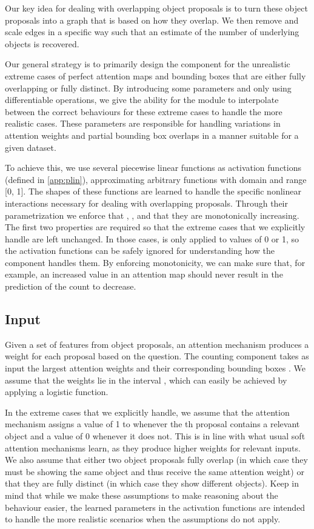 \documentclass[letterpaper]{article}
\begin{document}
Our key idea for dealing with overlapping object proposals is to turn these object proposals into a graph that is based on how they overlap.
We then remove and scale edges in a specific way such that an estimate of the number of underlying objects is recovered.

Our general strategy is to primarily design the component for the unrealistic extreme cases of perfect attention maps and bounding boxes that are either fully overlapping or fully distinct.
By introducing some parameters and only using differentiable operations, we give the ability for the module to interpolate between the correct behaviours for these extreme cases to handle the more realistic cases.
These parameters are responsible for handling variations in attention weights and partial bounding box overlaps in a manner suitable for a given dataset.

To achieve this, we use several piecewise linear functions  as activation functions (defined in \autoref{app:plin}), approximating arbitrary functions with domain and range [0, 1].
The shapes of these functions are learned to handle the specific nonlinear interactions necessary for dealing with overlapping proposals.
Through their parametrization we enforce that , , and that they are monotonically increasing.
The first two properties are required so that the extreme cases that we explicitly handle are left unchanged.
In those cases,  is only applied to values of 0 or 1, so the activation functions can be safely ignored for understanding how the component handles them.
By enforcing monotonicity, we can make sure that, for example, an increased value in an attention map should never result in the prediction of the count to decrease.

\subsection{Input}
Given a set of features from object proposals, an attention mechanism produces a weight for each proposal based on the question.
The counting component takes as input the  largest attention weights  and their corresponding bounding boxes .
We assume that the weights lie in the interval , which can easily be achieved by applying a logistic function.

In the extreme cases that we explicitly handle, we assume that the attention mechanism assigns a value of 1 to  whenever the th proposal contains a relevant object and a value of 0 whenever it does not.
This is in line with what usual soft attention mechanisms learn, as they produce higher weights for relevant inputs.
We also assume that either two object proposals fully overlap (in which case they must be showing the same object and thus receive the same attention weight) or that they are fully distinct (in which case they show different objects).
Keep in mind that while we make these assumptions to make reasoning about the behaviour easier, the learned parameters in the activation functions are intended to handle the more realistic scenarios when the assumptions do not apply.
\end{document}
